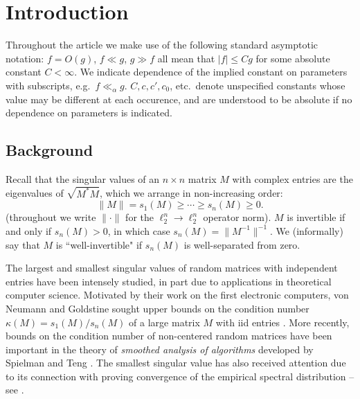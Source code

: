 \documentclass[aop,preprint]{imsart}
\theoremstyle{plain}
\theoremstyle{definition}
\theoremstyle{remark}
\numberwithin{equation}{section}
\numberwithin{theorem}{section}
\begin{document}





\section{Introduction}

Throughout the article we make use of the following standard asymptotic notation:
$f=O(g)$, $f\ll g$, $g\gg f$ all mean that $|f|\le Cg$ for some absolute constant $C<\infty$. 
We indicate dependence of the implied constant on parameters with subscripts, e.g.\ $f\ll_\alpha g$.
$C,c, c', c_0$, etc.\ denote unspecified constants whose value may be different at each occurence, and are understood to be absolute if no dependence on parameters is indicated.

\subsection{Background}

Recall that the singular values of an $n\times n$ matrix $M$ with complex entries are the eigenvalues of $\sqrt{M^*M}$, which we arrange in non-increasing order:
\[
\|M\|=s_1(M)\ge \cdots\ge s_n(M)\ge0.
\]
(throughout we write $\|\cdot \|$ for the $\ell_2^n\to \ell_2^n$ operator norm). 
$M$ is invertible if and only if $s_n(M)>0$, in which case $s_n(M)= \|M^{-1}\|^{-1}$.
We (informally) say that $M$ is ``well-invertible" if $s_n(M)$ is well-separated from zero. 

The largest and smallest singular values of random matrices with independent entries have been intensely studied, in part due to applications in theoretical computer science.
Motivated by their work on the first electronic computers, von Neumann and Goldstine sought upper bounds on the condition number $\kappa(M)= s_1(M)/s_n(M) $ of a large matrix $M$ with iid entries \citep{vNG:numerical}. 
More recently, bounds on the condition number of non-centered random matrices have been important in the theory of \emph{smoothed analysis of algorithms} developed by Spielman and Teng \citep{SST:smoothed}.
The smallest singular value 
has also received attention due to its connection with proving convergence of the empirical spectral distribution -- see 
\citep{TaVu:circ, BoCh:survey}.
%
\end{document}
